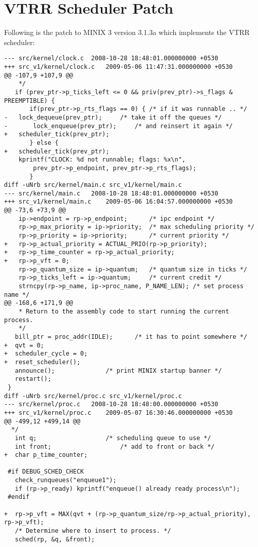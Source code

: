\chapter{VTRR Scheduler Patch}

\normalsize
Following is the patch to MINIX 3 version 3.1.3a which implements the VTRR scheduler:

\tiny
\begin{verbatim}
--- src/kernel/clock.c	2008-10-28 18:48:01.000000000 +0530
+++ src_v1/kernel/clock.c	2009-05-06 11:47:31.000000000 +0530
@@ -107,9 +107,9 @@
    */ 
   if (prev_ptr->p_ticks_left <= 0 && priv(prev_ptr)->s_flags & PREEMPTIBLE) {
       if(prev_ptr->p_rts_flags == 0) {	/* if it was runnable .. */
-	lock_dequeue(prev_ptr);		/* take it off the queues */
-      	lock_enqueue(prev_ptr);		/* and reinsert it again */ 
+	scheduler_tick(prev_ptr);
       } else {
+	scheduler_tick(prev_ptr);
 	kprintf("CLOCK: %d not runnable; flags: %x\n",
 		prev_ptr->p_endpoint, prev_ptr->p_rts_flags);
       }
diff -uNrb src/kernel/main.c src_v1/kernel/main.c
--- src/kernel/main.c	2008-10-28 18:48:01.000000000 +0530
+++ src_v1/kernel/main.c	2009-05-06 16:04:57.000000000 +0530
@@ -73,6 +73,9 @@
 	ip->endpoint = rp->p_endpoint;		/* ipc endpoint */
 	rp->p_max_priority = ip->priority;	/* max scheduling priority */
 	rp->p_priority = ip->priority;		/* current priority */
+	rp->p_actual_priority = ACTUAL_PRIO(rp->p_priority);
+	rp->p_time_counter = rp->p_actual_priority;
+	rp->p_vft = 0;
 	rp->p_quantum_size = ip->quantum;	/* quantum size in ticks */
 	rp->p_ticks_left = ip->quantum;		/* current credit */
 	strncpy(rp->p_name, ip->proc_name, P_NAME_LEN); /* set process name */
@@ -168,6 +171,9 @@
    * Return to the assembly code to start running the current process. 
    */
   bill_ptr = proc_addr(IDLE);		/* it has to point somewhere */
+  qvt = 0;
+  scheduler_cycle = 0;
+  reset_scheduler();
   announce();				/* print MINIX startup banner */
   restart();
 }
diff -uNrb src/kernel/proc.c src_v1/kernel/proc.c
--- src/kernel/proc.c	2008-10-28 18:48:00.000000000 +0530
+++ src_v1/kernel/proc.c	2009-05-07 16:30:46.000000000 +0530
@@ -499,12 +499,14 @@
  */
   int q;	 				/* scheduling queue to use */
   int front;					/* add to front or back */
+  char p_time_counter;
 
 #if DEBUG_SCHED_CHECK
   check_runqueues("enqueue1");
   if (rp->p_ready) kprintf("enqueue() already ready process\n");
 #endif
 
+  rp->p_vft = MAX(qvt + (rp->p_quantum_size/rp->p_actual_priority), rp->p_vft);
   /* Determine where to insert to process. */
   sched(rp, &q, &front);
 

\end{verbatim}
